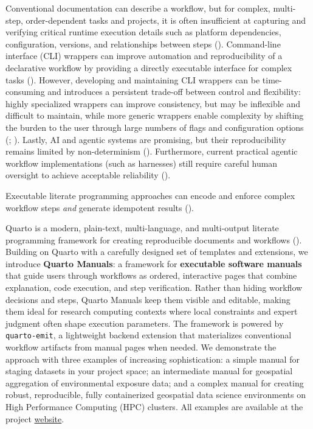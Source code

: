 \documentclass[
  man,
  floatsintext,
  longtable,
  nolmodern,
  notxfonts,
  notimes,
  12pt,
  colorlinks=true,linkcolor=blue,citecolor=blue,urlcolor=blue]{apa7}
\begin{document}
Conventional documentation can describe a workflow, but for complex,
multi-step, order-dependent tasks and projects, it is often insufficient
at capturing and verifying critical runtime execution details such as
platform dependencies, configuration, versions, and relationships
between steps (). Command-line interface (CLI) wrappers can improve
automation and reproducibility of a declarative workflow by providing a
directly executable interface for complex tasks
(). However, developing and maintaining CLI wrappers
can be time-consuming and introduces a persistent trade-off between
control and flexibility: highly specialized wrappers can improve
consistency, but may be inflexible and difficult to maintain, while more
generic wrappers enable complexity by shifting the burden to the user
through large numbers of flags and configuration options
(;
). Lastly, AI and agentic systems are promising, but their
reproducibility remains limited by non-determinism
().
Furthermore, current practical agentic workflow implementations (such as
harnesses) still require careful human oversight to achieve acceptable
reliability ().

Executable literate programming approaches can encode and enforce
complex workflow steps \emph{and} generate idempotent results
().

Quarto is a modern, plain-text, multi-language, and multi-output
literate programming framework for creating reproducible documents and
workflows ().
Building on Quarto with a carefully designed set of templates and
extensions, we introduce \textbf{Quarto Manuals}: a framework for
\textbf{executable software manuals} that guide users through workflows
as ordered, interactive pages that combine explanation, code execution,
and step verification. Rather than hiding workflow decisions and steps,
Quarto Manuals keep them visible and editable, making them ideal for
research computing contexts where local constraints and expert judgment
often shape execution parameters. The framework is powered by
\texttt{quarto-emit}, a lightweight backend extension that materializes
conventional workflow artifacts from manual pages when needed. We
demonstrate the approach with three examples of increasing
sophistication: a simple manual for staging datasets in your project
space; an intermediate manual for geospatial aggregation of
environmental exposure data; and a complex manual for creating robust,
reproducible, fully containerized geospatial data science environments
on High Performance Computing (HPC) clusters. All examples are available
at the project
\href{https://goldenplanetaryhealthlab.github.io/QuartoManual/}{website}.
\end{document}
